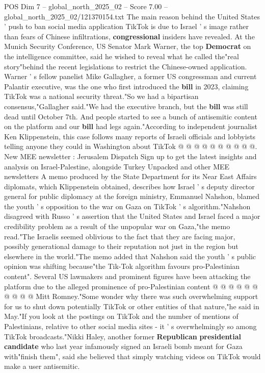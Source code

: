 \begin{textsample}{POS Dim 7 – global\_north\_2025\_02 – Score 7.00 – global\_north\_2025\_02/121370154.txt}  \label{ex:f7_pos_278}
The main reason behind the United States ' push to ban social media application TikTok is due to Israel ' s image rather than fears of Chinese infiltrations, \textbf{congressional} insiders have revealed.
At the Munich Security Conference, US Senator Mark Warner, the top \textbf{Democrat} on the intelligence committee, said he wished to reveal what he called the"real story"behind the recent legislations to restrict the Chinese-owned application.
Warner ' s fellow panelist Mike Gallagher, a former US congressman and current Palantir executive, was the one who first introduced the \textbf{bill} in 2023, claiming TikTok was a national security threat."So we had a bipartisan consensus,"Gallagher said."We had the executive branch, but the \textbf{bill} was still dead until October 7th.
And people started to see a bunch of antisemitic content on the platform and our \textbf{bill} had legs again."According to independent journalist Ken Klippenstein, this case follows many reports of Israeli officials and lobbyists telling anyone they could in Washington about TikTok @ @ @ @ @ @ @ @ @ @.
New MEE newsletter : Jerusalem Dispatch Sign up to get the latest insights and analysis on Israel-Palestine, alongside Turkey Unpacked and other MEE newsletters A memo produced by the State Department for its Near East Affairs diplomats, which Klippenstein obtained, describes how Israel ' s deputy director general for public diplomacy at the foreign ministry, Emmanuel Nahshon, blamed the youth ' s opposition to the war on Gaza on TikTok ' s algorithm."Nahshon disagreed with Russo ' s assertion that the United States and Israel faced a major credibility problem as a result of the unpopular war on Gaza,"the memo read."The Israelis seemed oblivious to the fact that they are facing major, possibly generational damage to their reputation not just in the region but elsewhere in the world."The memo added that Nahshon said the youth ' s public opinion was shifting because"the Tik-Tok algorithm favours pro-Palestinian content".
Several US lawmakers and prominent figures have been attacking the platform due to the alleged prominence of pro-Palestinian content @ @ @ @ @ @ @ @ @ @ Mitt Romney."Some wonder why there was such overwhelming support for us to shut down potentially TikTok or other entities of that nature,"he said in May."If you look at the postings on TikTok and the number of mentions of Palestinians, relative to other social media sites - it ' s overwhelmingly so among TikTok broadcasts."Nikki Haley, another former \textbf{Republican} \textbf{presidential} \textbf{candidate} who last year infamously signed an Israeli bomb meant for Gaza with"finish them", said she believed that simply watching videos on TikTok would make a user antisemitic.

\end{textsample}
